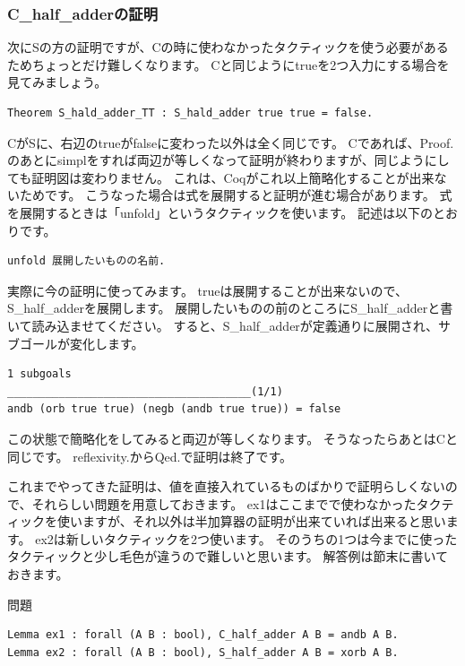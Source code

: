 \documentclass{jsbook}
\begin{document}
\subsubsection*{C\_half\_adderの証明}
次にSの方の証明ですが、Cの時に使わなかったタクティックを使う必要があるためちょっとだけ難しくなります。
Cと同じようにtrueを2つ入力にする場合を見てみましょう。
\begin{verbatim}
Theorem S_hald_adder_TT : S_hald_adder true true = false.
\end{verbatim}
CがSに、右辺のtrueがfalseに変わった以外は全く同じです。
Cであれば、Proof.のあとにsimplをすれば両辺が等しくなって証明が終わりますが、同じようにしても証明図は変わりません。
これは、Coqがこれ以上簡略化することが出来ないためです。
こうなった場合は式を展開すると証明が進む場合があります。
式を展開するときは「unfold」というタクティックを使います。
記述は以下のとおりです。
\begin{verbatim}
unfold 展開したいものの名前.
\end{verbatim}
実際に今の証明に使ってみます。
trueは展開することが出来ないので、S\_half\_adderを展開します。
展開したいものの前のところにS\_half\_adderと書いて読み込ませてください。
すると、S\_half\_adderが定義通りに展開され、サブゴールが変化します。
\begin{verbatim}
1 subgoals
______________________________________(1/1)
andb (orb true true) (negb (andb true true)) = false
\end{verbatim}
この状態で簡略化をしてみると両辺が等しくなります。
そうなったらあとはCと同じです。
reflexivity.からQed.で証明は終了です。

これまでやってきた証明は、値を直接入れているものばかりで証明らしくないので、それらしい問題を用意しておきます。
ex1はここまでで使わなかったタクティックを使いますが、それ以外は半加算器の証明が出来ていれば出来ると思います。
ex2は新しいタクティックを2つ使います。
そのうちの1つは今までに使ったタクティックと少し毛色が違うので難しいと思います。
解答例は節末に書いておきます。

\begin{itembox}[l]{問題}
\begin{verbatim}
Lemma ex1 : forall (A B : bool), C_half_adder A B = andb A B.
Lemma ex2 : forall (A B : bool), S_half_adder A B = xorb A B. 
\end{verbatim}
\end{itembox}
\end{document}
